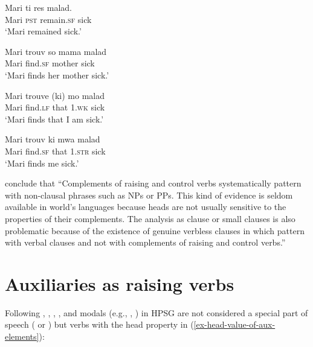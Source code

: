 \documentclass[output=paper
	        ,collection
	        ,collectionchapter
 	        ,biblatex
                ,babelshorthands
                ,newtxmath
                ,draftmode
                ,colorlinks, citecolor=brown
]{langscibook}
\begin{document}
\eal
\ex 
\gll Mari ti res  malad.\\
     Mari \textsc{pst} remain.\textsc{sf} sick\\\hfill\citep[]{HenriandLaurens2011}
\glt `Mari remained sick.'

\ex 
\gll Mari trouv  so mama malad\\
     Mari find.\textsc{sf} \POSS{} mother sick\\
\glt `Mari finds her mother sick.'

\ex 
\gll Mari trouve (ki) mo malad\\
     Mari find.\textsc{lf} that 1\SG.\textsc{wk} sick\\
\glt `Mari finds that I am sick.'

\ex 
\gll Mari trouv            ki   mwa               malad\\
     Mari find.\textsc{sf} that 1\SG.\textsc{str} sick\\
\glt `Mari finds me sick.'
\zl

\citet[]{HenriandLaurens2011} conclude that ``Complements of raising and control verbs
systematically pattern with non-clausal phrases such as NPs or PPs. This kind of evidence is seldom
available in world's languages because heads are not usually sensitive to the properties of their
complements. The analysis as clause or small clauses is also problematic because of the existence of
genuine verbless clauses in  which pattern with verbal clauses and not with
complements of raising and control verbs.''




\section{Auxiliaries as raising verbs}
\label{sec-auxiliaries-as-raising-verbs}

Following \citep{Ross69a-u,Gazdaretal1982, Sagetal2020}, , , , and
modals (e.g., , ) in HPSG are not considered a special part of speech
( or ) but verbs with the head property in
(\ref{ex-head-value-of-aux-elements}):

\begin{exe}
\ex \label{ex-head-value-of-aux-elements}
   \impl
\avm{
	[head &	[aux & $+$] ]
}
 \end{exe}
 
\end{document}
